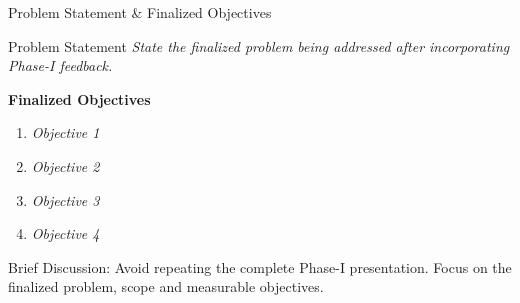 \documentclass[aspectratio=169,11pt]{beamer}
\newcommand{\smallnote}[1]{%
\vspace{0.08cm}
{\scriptsize\color{GEUGrey}#1}
}
\newcommand{\placeholder}[1]{%
\textit{\color{GEUGrey}#1}
}
\begin{document}
\begin{frame}{Problem Statement \& Finalized Objectives}

\begin{block}{Problem Statement}
\placeholder{
State the finalized problem being addressed after incorporating
Phase-I feedback.
}
\end{block}

\vspace{2mm}

\textbf{\color{GEUBlue}Finalized Objectives}

\begin{enumerate}\itemsep3pt
\item \placeholder{Objective 1}
\item \placeholder{Objective 2}
\item \placeholder{Objective 3}
\item \placeholder{Objective 4}
\end{enumerate}

\vfill

\smallnote{
Brief Discussion: Avoid repeating the complete Phase-I presentation.
Focus on the finalized problem, scope and measurable objectives.
}

\end{frame}
\end{document}
